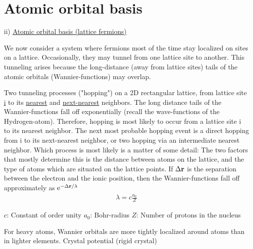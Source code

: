 
\section{Atomic orbital basis}

\noindent ii) \uline{Atomic orbital basis (lattice fermions)}

\noindent We now consider a system where fermions most of the time stay localized on sites on a lattice. Occasionally, they may tunnel from one lattice site to another. This tunneling arises because the long-distance (away from lattice sites) tails of the atomic orbitals (Wannier-functions) may overlap.

\begin{center}
\end{center}
\noindent Two tunneling processes ("hopping") on a 2D rectangular lattice, from lattice site \uline{i} to its \uline{nearest} and \uline{next-nearest} neighbors. The long distance tails of the Wannier-functions fall off exponentially (recall the wave-functions of the Hydrogen-atom). Therefore, hopping is most likely to occur from a lattice site i to its nearest neighbor. The next most probable hopping event is a direct hopping from i to its next-nearest neighbor, or two hopping via an intermediate nearest neighbor. Which process is most likely is a matter of some detail: The two factors that mostly determine this is the distance between atoms on the lattice, and the type of atoms which are situated on the lattice points. If $\Delta \vb{r}$ is the separation between the electron and the ionic position, then the Wannier-functions fall off approximately as $\mathrm{e}^{-\Delta \vb{r}/\lambda}$
\begin{align*}
	\lambda = c \frac{a_0}{Z}
\end{align*}

\noindent $c$: Constant of order unity \newline
\noindent $a_0$: Bohr-radius\newline
\noindent $Z$: Number of protons in the nucleus\newline

\noindent For heavy atoms, Wannier orbitals are more tightly localized around atoms than in lighter elements. \newline
Crystal potential (rigid crystal) \newline


